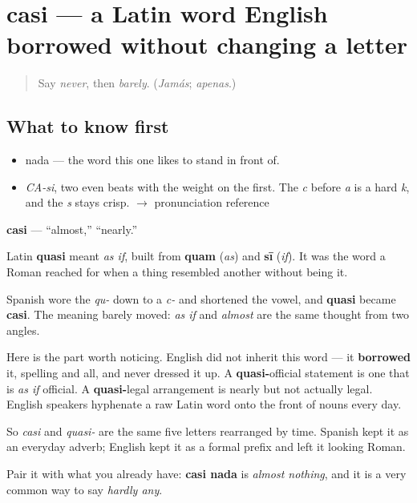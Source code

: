 \section[casi]{casi — a Latin word English borrowed without changing a letter}

\label{lesson:ES-C328-casi}



\begin{quote}
Say \emph{never}, then \emph{barely}. (\emph{Jamás}; \emph{apenas}.)
\end{quote}

\subsection*{What to know first}
\begin{itemize}
\raggedright
  \item nada — the word this one likes to stand in front of.
\end{itemize}

\begin{sounds}
\begin{itemize}
\raggedright
  \item \emph{CA-si}, two even beats with the weight on the first. The \emph{c} before \emph{a} is a hard \emph{k}, and the \emph{s} stays crisp. $\to$ pronunciation reference
\end{itemize}
\end{sounds}

\begin{cousinweb}
\textbf{casi} — \textquotedblleft{}almost,\textquotedblright{} \textquotedblleft{}nearly.\textquotedblright{}

Latin \textbf{quasi} meant \emph{as if}, built from \textbf{quam} (\emph{as}) and \textbf{sī} (\emph{if}). It was the word a Roman reached for when a thing resembled another without being it.

Spanish wore the \emph{qu-} down to a \emph{c-} and shortened the vowel, and \textbf{quasi} became \textbf{casi}. The meaning barely moved: \emph{as if} and \emph{almost} are the same thought from two angles.

Here is the part worth noticing. English did not inherit this word — it \textbf{borrowed} it, spelling and all, and never dressed it up. A \textbf{quasi-}official statement is one that is \emph{as if} official. A \textbf{quasi-}legal arrangement is nearly but not actually legal. English speakers hyphenate a raw Latin word onto the front of nouns every day.

So \emph{casi} and \emph{quasi-} are the same five letters rearranged by time. Spanish kept it as an everyday adverb; English kept it as a formal prefix and left it looking Roman.

Pair it with what you already have: \textbf{casi nada} is \emph{almost nothing}, and it is a very common way to say \emph{hardly any}.
\end{cousinweb}

